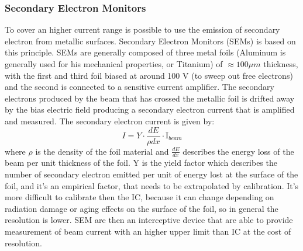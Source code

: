 \documentclass[12pt,a4paper]{report}
\begin{document}
	\subsubsection{Secondary Electron Monitors}
	To cover an higher current range is possible to use the emission of secondary electron from metallic surfaces. Secondary Electron Monitors (SEMs) is based on this principle. SEMs are generally composed of three metal foils (Aluminum is generally used for his mechanical properties, or Titanium) of $\approx 100 \mu m$ thickness, with the first and third foil biased at around 100 V (to sweep out free electrons) and the second is connected to a sensitive current amplifier. The secondary electrons produced by the beam that has crossed the metallic foil is drifted away by the bias electric field producing a secondary electron current that is amplified and measured. The secondary electron current is given by:
	\begin{equation}
		I= Y \cdot \frac{dE}{\rho dx} \cdot \text{I}_{beam}
	\end{equation}
	where $\rho$ is the density of the foil material and $\frac{dE}{dx}$ describes the energy loss of the beam per unit thickness of the foil. Y is the yield factor which describes the number of secondary electron emitted per unit of energy lost at the surface of the foil, and it's an empirical factor, that needs to be extrapolated by calibration. It's more difficult to calibrate then the IC, because it can change depending on radiation damage or aging effects on the surface of the foil, so in general the resolution is lower. SEM are then an interceptive device that are able to provide measurement of beam current with an higher upper limit than IC at the cost of resolution.
\end{document}
